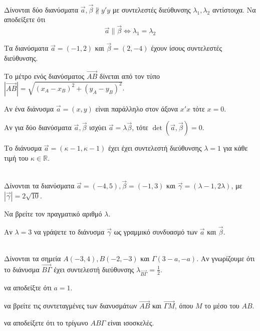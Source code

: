 \documentclass[11pt,a4paper,modern,B]{FFExam}
\begin{document}
\begin{thema}
\item\mbox{}\\\vspace{-2mm}
\begin{erwthma}
\item Δίνονται δύο διανύσματα $\vec{a},\vec{\beta}\nparallel y'y$ με συντελεστές διεύθυνσης $\lambda_1,\lambda_2$ αντίστοιχα. Να αποδείξετε ότι \[\vec{a}\parallel\vec{\beta}\Leftrightarrow \lambda_1=\lambda_2\]
\item \swstolathospan
\begin{alist}
\item Τα διανύσματα $\vec{a}=(-1,2)$ και $\vec{\beta}=(2,-4)$ έχουν ίσους συντελεστές διεύθυνσης.
\item Το μέτρο ενός διανύσματος $\overrightarrow{AB}$ δίνεται από τον τύπο $\left|\overrightarrow{AB}\right|=\sqrt{(x_A-x_B)^2+(y_A-y_B)^2}$.
\item Αν ένα διάνυσμα $\vec{a}=(x,y)$ είναι παράλληλο στον άξονα $x'x$ τότε $x=0$.
\item Αν για δύο διανύσματα $\vec{a},\vec{\beta}$ ισχύει $\vec{a}=\lambda\vec{\beta}$, τότε $\det{\left(\vec{a},\vec{\beta}\right)=0}$.
\item Το διάνυσμα $\vec{a}=(\kappa-1,\kappa-1)$ έχει έχει συντελεστή διεύθυνσης $\lambda=1$ για κάθε τιμή του $\kappa\in\mathbb{R}$.
\end{alist}
\end{erwthma}
\item\mbox{}\\
Δίνονται τα διανύσματα $\vec{a}=(-4,5),\vec{\beta}=(-1,3)$ και $\vec{\gamma}=(\lambda-1,2\lambda)$, με $\left|\vec{\gamma}\right|=2\sqrt{10}$.
\begin{erwthma}
\item Να βρείτε τον πραγματικό αριθμό $\lambda$. 
\item Αν $\lambda=3$ να γράψετε το διάνυσμα $\vec{\gamma}$ ως γραμμικό συνδυασμό των $\vec{a}$ και $\vec{\beta}$.
\end{erwthma}
\item\mbox{}\\
Δίνονται τα σημεία $A(-3,4),B(-2,-3)$ και $\varGamma(3-a,-a)$. Αν γνωρίζουμε ότι το διάνυσμα $\overrightarrow{B\varGamma}$ έχει συντελεστή διεύθυνσης $\lambda_{\overrightarrow{B\varGamma}}=\frac{1}{2}$.
\begin{erwthma}
\item να αποδείξτε ότι $a=1$.
\item να βρείτε τις συντεταγμένες των διανυσμάτων $\overrightarrow{AB}$ και $\overrightarrow{\varGamma M}$, όπου $M$ το μέσο του $AB$.
\item να αποδείξετε ότι το τρίγωνο $AB\varGamma$ είναι ισοσκελές.
\end{erwthma}
\item\mbox{}\\

\begin{erwthma}
\item {}
\end{erwthma}
\end{thema}
\kaliepityxia
\end{document}

